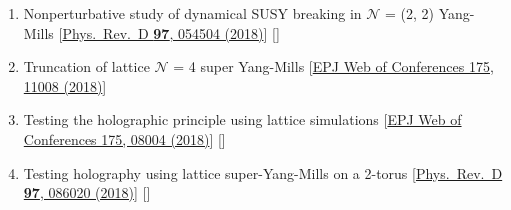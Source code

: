 \begin{enumerate}
 \item Nonperturbative study of dynamical SUSY breaking in $\mathcal{N}$ = (2, 2) Yang-Mills [\href{https://journals.aps.org/prd/abstract/10.1103/PhysRevD.97.054504}{Phys.\ Rev.\ D {\bf 97}, 054504 (2018)}] [\texttt{\textbf{}}]  
 \item Truncation of lattice $\mathcal{N}$ = 4 super Yang-Mills [\href{https://doi.org/10.1051/epjconf/201817511008}{EPJ Web of Conferences 175, 11008 (2018)}] %
\item Testing the holographic principle using lattice simulations  [\href{https://doi.org/10.1051/epjconf/201817508004}{EPJ Web of Conferences 175, 08004 (2018)}] [\texttt{\textbf{}}] %
\item Testing holography using lattice super-Yang-Mills on a 2-torus [\href{https://journals.aps.org/prd/abstract/10.1103/PhysRevD.97.086020}{Phys.\ Rev.\ D {\bf 97}, 086020 (2018)}] [\texttt{\textbf{}}]
\end{enumerate}

